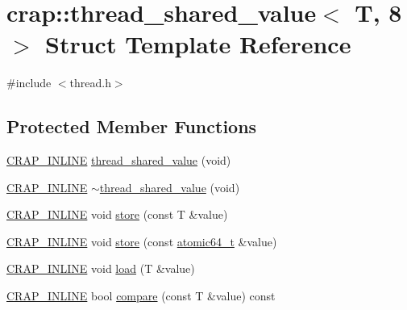 \hypertarget{structcrap_1_1thread__shared__value_3_01_t_00_018_01_4}{\section{crap\+:\+:thread\+\_\+shared\+\_\+value$<$ T, 8 $>$ Struct Template Reference}
\label{structcrap_1_1thread__shared__value_3_01_t_00_018_01_4}
}


{\ttfamily \#include $<$thread.\+h$>$}

\subsection*{Protected Member Functions}
\begin{DoxyCompactItemize}
\item 
\hyperlink{config__x86_8h_a5a40526b8d842e7ff731509998bb0f1c}{C\+R\+A\+P\+\_\+\+I\+N\+L\+I\+N\+E} \hyperlink{structcrap_1_1thread__shared__value_3_01_t_00_018_01_4_ad8854aceee43b5aee1e1126cd15142f3}{thread\+\_\+shared\+\_\+value} (void)
\item 
\hyperlink{config__x86_8h_a5a40526b8d842e7ff731509998bb0f1c}{C\+R\+A\+P\+\_\+\+I\+N\+L\+I\+N\+E} \hyperlink{structcrap_1_1thread__shared__value_3_01_t_00_018_01_4_a92757d16c1d9826524a7923a3722d00f}{$\sim$thread\+\_\+shared\+\_\+value} (void)
\item 
\hyperlink{config__x86_8h_a5a40526b8d842e7ff731509998bb0f1c}{C\+R\+A\+P\+\_\+\+I\+N\+L\+I\+N\+E} void \hyperlink{structcrap_1_1thread__shared__value_3_01_t_00_018_01_4_ac4a1a9bffc1f171a5126797c8d33a4cf}{store} (const T \&value)
\item 
\hyperlink{config__x86_8h_a5a40526b8d842e7ff731509998bb0f1c}{C\+R\+A\+P\+\_\+\+I\+N\+L\+I\+N\+E} void \hyperlink{structcrap_1_1thread__shared__value_3_01_t_00_018_01_4_a533b6f4e88f5b9fbd58570ff5e83a420}{store} (const \hyperlink{structcrap_1_1atomic64__t}{atomic64\+\_\+t} \&value)
\item 
\hyperlink{config__x86_8h_a5a40526b8d842e7ff731509998bb0f1c}{C\+R\+A\+P\+\_\+\+I\+N\+L\+I\+N\+E} void \hyperlink{structcrap_1_1thread__shared__value_3_01_t_00_018_01_4_a631e6b453c1ba10a1df6045c01def481}{load} (T \&value)
\item 
\hyperlink{config__x86_8h_a5a40526b8d842e7ff731509998bb0f1c}{C\+R\+A\+P\+\_\+\+I\+N\+L\+I\+N\+E} bool \hyperlink{structcrap_1_1thread__shared__value_3_01_t_00_018_01_4_a3e52f507817f4a8a3e29a5ee4bef9e8c}{compare} (const T \&value) const 

\end{DoxyCompactItemize}
